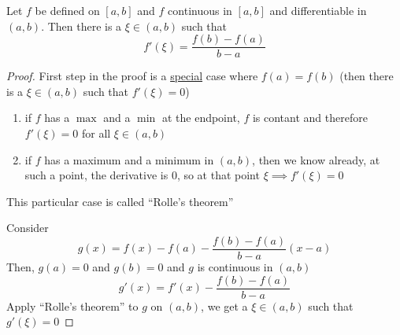 Let $f$ be defined on $\left[a, b\right]$ and $f$ continuous in $\left[a, b\right]$ and differentiable in $(a, b)$. 
Then there is a $\xi \in (a, b)$ such that $$f'(\xi) = \frac{f(b) - f(a)}{b-a}$$

\begin{proof}
  First step in the proof is a \underline{special} case where $f(a) = f(b)$
  (then there is a $\xi \in (a, b)$ such that $f'(\xi) = 0$)
  \begin{enumerate}
    \item if $f$ has a $\max$ and a $\min$ at the endpoint, $f$ is contant and therefore $f'(\xi) = 0$ for all $\xi \in (a, b)$
    \item if $f$ has a maximum and a minimum in $(a, b)$, then we know already, at such a point, the derivative is $0$,
    so at that point $\xi \implies f'(\xi) = 0$
  \end{enumerate}
  This particular case is called ``Rolle's theorem''

  Consider $$g(x) = f(x) - f(a) - \frac{f(b) - f(a)}{b-a}(x-a)$$
  Then, $g(a) = 0$ and $g(b) = 0$ and $g$ is continuous in $(a, b)$
  $$g'(x) = f'(x) - \frac{f(b) - f(a)}{b-a}$$
  Apply ``Rolle's theorem'' to $g$ on $(a, b)$, we get a $\xi \in (a, b)$ such that $g'(\xi) = 0$
\end{proof}